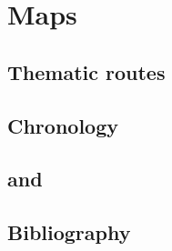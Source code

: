 \chapter{Maps}
\section{Thematic routes}
\section{Chronology}
\section{\separake}
\section{\mirage}
\section{\lantern}
\section{\dechorate}
\section{\blaster and }

\section{Bibliography}